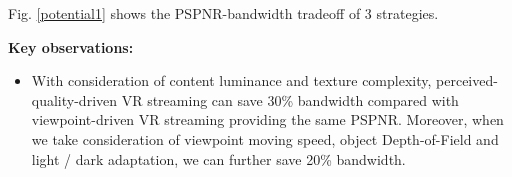 Fig. \ref{potential1} shows the PSPNR-bandwidth tradeoff of 3 strategies.

\textbf{Key observations:} 
\begin{itemize}
\item With consideration of content luminance and texture complexity, perceived-quality-driven VR streaming can save 30\% bandwidth compared with viewpoint-driven VR streaming providing the same PSPNR. Moreover, when we take consideration of viewpoint moving speed, object Depth-of-Field and light / dark adaptation, we can further save 20\% bandwidth.
\end{itemize}